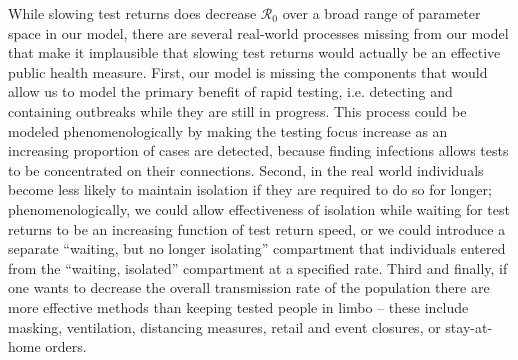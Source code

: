 \documentclass[12pt]{article}
\newcommand{\Rnum}{\ensuremath{\mathcal{R}_0}\xspace}
\DeclareRobustCommand\_{\ifmmode\expandafter\subtxt\else\textunderscore\fi}
\theoremstyle{definition} %
\begin{document}
While slowing test returns does decrease $\Rnum$ over a broad range of parameter space in our model, there are several real-world processes missing from our model that make it implausible that slowing test returns would actually be an effective public health measure. First, our model is missing the components that would allow us to model the primary benefit of rapid testing, i.e. detecting and containing outbreaks while they are still in progress. This process could be modeled phenomenologically by making the testing focus increase as an increasing proportion of cases are detected, because finding infections allows tests to be concentrated on their connections. Second, in the real world individuals become less likely to maintain isolation if they are required to do so for longer; phenomenologically, we could allow  effectiveness of isolation while waiting for test returns to be an increasing function of test return speed, or we could introduce a separate ``waiting, but no longer isolating'' compartment that individuals entered from the ``waiting, isolated'' compartment at a specified rate. Third and finally, if one wants to decrease the overall transmission rate of the population there are more effective methods than keeping tested people in limbo -- these include masking, ventilation, distancing measures, retail and event closures, or stay-at-home orders.
\end{document}

